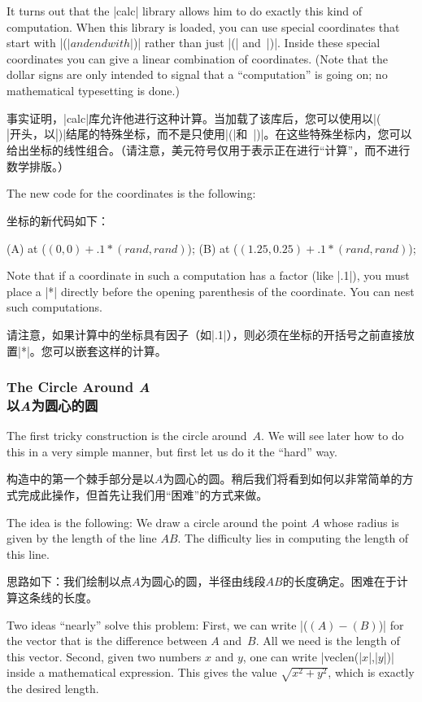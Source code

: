 \begin{paracol}{2}
It turns out that the |calc| library allows him to do exactly this kind of
computation. When this library is loaded, you can use special coordinates that
start with |($| and end with |$)| rather than just |(| and~|)|. Inside these
special coordinates you can give a linear combination of coordinates. (Note
that the dollar signs are only intended to signal that a ``computation'' is
going on; no mathematical typesetting is done.)

事实证明，|calc|库允许他进行这种计算。当加载了该库后，您可以使用以|($|开头，以|$)|结尾的特殊坐标，而不是只使用|(|和~|)|。在这些特殊坐标内，您可以给出坐标的线性组合。（请注意，美元符号仅用于表示正在进行“计算”，而不进行数学排版。）

The new code for the coordinates is the following:

坐标的新代码如下：
%
\begin{codeexample}
\coordinate [...] (A) at ($ (0,0) + .1*(rand,rand) $);
\coordinate [...] (B) at ($ (1.25,0.25) + .1*(rand,rand) $);
\end{codeexample}

Note that if a coordinate in such a computation has a factor (like |.1|), you
must place a |*| directly before the opening parenthesis of the coordinate. You
can nest such computations.

请注意，如果计算中的坐标具有因子（如|.1|），则必须在坐标的开括号之前直接放置|*|。您可以嵌套这样的计算。



\subsubsection{The Circle Around \emph{A}\\以\emph{A}为圆心的圆}

The first tricky construction is the circle around~$A$. We will see later how
to do this in a very simple manner, but first let us do it the ``hard'' way.

构造中的第一个棘手部分是以$A$为圆心的圆。稍后我们将看到如何以非常简单的方式完成此操作，但首先让我们用“困难”的方式来做。

The idea is the following: We draw a circle around the point $A$ whose radius
is given by the length of the line $AB$. The difficulty lies in computing the
length of this line.

思路如下：我们绘制以点$A$为圆心的圆，半径由线段$AB$的长度确定。困难在于计算这条线的长度。

Two ideas ``nearly'' solve this problem: First, we can write |($ (A) - (B) $)|
for the vector that is the difference between $A$ and~$B$. All we need is the
length of this vector. Second, given two numbers $x$ and $y$, one can write
|veclen(|$x$|,|$y$|)| inside a mathematical expression. This gives the value
$\sqrt{x^2+y^2}$, which is exactly the desired length.


\end{paracol}
